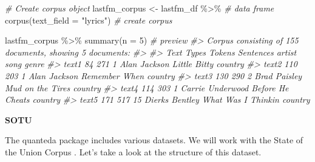 \documentclass[
]{article}
\newenvironment{Shaded}{\begin{snugshade}}{\end{snugshade}}
\newcommand{\AttributeTok}[1]{\textcolor[rgb]{0.77,0.63,0.00}{#1}}
\newcommand{\CommentTok}[1]{\textcolor[rgb]{0.56,0.35,0.01}{\textit{#1}}}
\newcommand{\DecValTok}[1]{\textcolor[rgb]{0.00,0.00,0.81}{#1}}
\newcommand{\FunctionTok}[1]{\textcolor[rgb]{0.00,0.00,0.00}{#1}}
\newcommand{\NormalTok}[1]{#1}
\newcommand{\OtherTok}[1]{\textcolor[rgb]{0.56,0.35,0.01}{#1}}
\newcommand{\SpecialCharTok}[1]{\textcolor[rgb]{0.00,0.00,0.00}{#1}}
\newcommand{\StringTok}[1]{\textcolor[rgb]{0.31,0.60,0.02}{#1}}
\begin{document}
\begin{Shaded}
\begin{Highlighting}[]
\CommentTok{\# Create corpus object}
\NormalTok{lastfm\_corpus }\OtherTok{\textless{}{-}} 
\NormalTok{  lastfm\_df }\SpecialCharTok{\%\textgreater{}\%} \CommentTok{\# data frame}
  \FunctionTok{corpus}\NormalTok{(}\AttributeTok{text\_field =} \StringTok{"lyrics"}\NormalTok{) }\CommentTok{\# create corpus}

\NormalTok{lastfm\_corpus }\SpecialCharTok{\%\textgreater{}\%} 
  \FunctionTok{summary}\NormalTok{(}\AttributeTok{n =} \DecValTok{5}\NormalTok{) }\CommentTok{\# preview}
\CommentTok{\#\textgreater{} Corpus consisting of 155 documents, showing 5 documents:}
\CommentTok{\#\textgreater{} }
\CommentTok{\#\textgreater{}   Text Types Tokens Sentences           artist                song   genre}
\CommentTok{\#\textgreater{}  text1    84    271         1     Alan Jackson        Little Bitty country}
\CommentTok{\#\textgreater{}  text2   110    203         1     Alan Jackson       Remember When country}
\CommentTok{\#\textgreater{}  text3   130    290         2     Brad Paisley    Mud on the Tires country}
\CommentTok{\#\textgreater{}  text4   114    303         1 Carrie Underwood    Before He Cheats country}
\CommentTok{\#\textgreater{}  text5   171    517        15   Dierks Bentley What Was I Thinkin\textquotesingle{} country}
\end{Highlighting}
\end{Shaded}

\textbf{SOTU}

The quanteda package \citep{R-quanteda} includes various datasets. We will work with the State of the Union Corpus \citep{R-quanteda.corpora}. Let's take a look at the structure of this dataset.

\begin{Shaded}
\end{Shaded}
\end{document}
